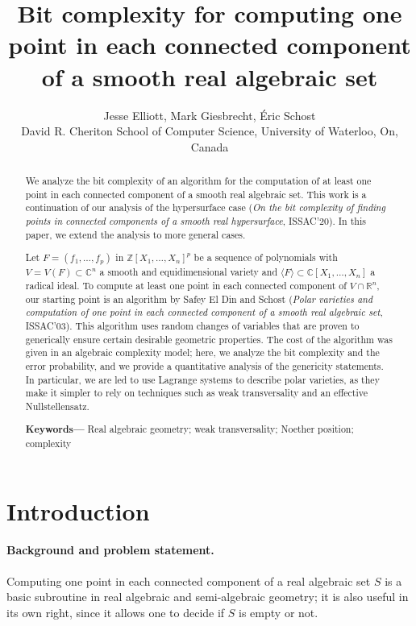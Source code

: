\documentclass[12pt]{article}
\title{Bit complexity for computing one point in each connected component of a smooth real algebraic set}
\author{Jesse Elliott, Mark Giesbrecht, \'Eric Schost  \\
  \small David R. Cheriton School of Computer Science, University of Waterloo, On, Canada \\
}
\date{} %
\def\C{\mathbb{C}}
\providecommand{\keywords}[1]
{
  \smallskip\noindent\small	
  \textbf{\textbf{Keywords---}} #1
}
\begin{document}
%
\maketitle
%
%
%
\begin{abstract}
We analyze the bit complexity of an algorithm for the computation of
at least one point in each connected component of a smooth real
algebraic set. This work is a continuation of our analysis of the
hypersurface case ({\em On the bit complexity of finding points in
  connected components of a smooth real hypersurface}, ISSAC'20). In
this paper, we extend the analysis to more general cases.

Let $F=(f_1,\hdots, f_p)$ in $\mathbb{Z}[X_1, \hdots , X_n]^p$ be a
sequence of polynomials with $V = V(F) \subset \C^n$ a smooth and
equidimensional variety and $\langle F \rangle \subset \C[X_1, \hdots
  , X_n]$ a radical ideal. To compute at least one point in each
connected component of $V \cap \mathbb{R}^n$, our starting point is an
algorithm by Safey El Din and Schost ({\em Polar varieties and
  computation of one point in each connected component of a smooth
  real algebraic set}, ISSAC'03). This algorithm uses random changes
of variables that are proven to generically ensure certain desirable
geometric properties. The cost of the algorithm was given in an
algebraic complexity model; here, we analyze the bit complexity and
the error probability, and we provide a quantitative analysis of the
genericity statements. In particular, we are led to use Lagrange
systems to describe polar varieties, as they make it simpler to
rely on techniques such as weak transversality and an effective 
Nullstellensatz.

\keywords{Real algebraic geometry; weak transversality; Noether
  position; complexity}
\end{abstract}
%


\section{Introduction}

\paragraph*{Background and problem statement.}
Computing one point in each connected component of a real algebraic
set $S$ is a basic subroutine in real algebraic and semi-algebraic
geometry; it is also useful in its own right, since it allows one to
decide if $S$ is empty or not. 
\end{document}
